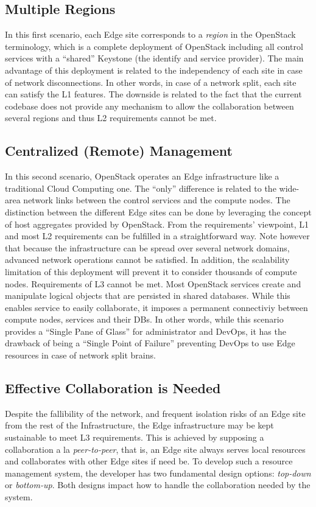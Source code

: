 \subsection{Multiple Regions}
In this first scenario, each Edge site corresponds to a \emph{region}
in the OpenStack terminology, which is a complete deployment of
OpenStack including all control services with a ``shared'' Keystone
(\ie the identify and service provider). The main advantage of this
deployment is related to the independency of each site in case of
network disconnections. In other words, in case of a network split,
each site can satisfy the L1 features. The downside is related to the
fact that the current codebase does not provide any mechanism to allow
the collaboration between several regions and thus L2 requirements
cannot be met.

\subsection{Centralized (Remote) Management}
\label{subsec:centralized_os}
In this second scenario, OpenStack operates an Edge infrastructure
like a traditional Cloud Computing one. The ``only'' difference is
related to the wide-area network links between the control services
and the compute nodes. The distinction between the different Edge
sites can be done by leveraging the concept of host aggregates
provided by OpenStack.
%
From the requirements' viewpoint, L1 and most L2 requirements can be
fulfilled in a straightforward way. Note however that because the
infrastructure can be spread over several network domains, advanced
network operations cannot be satisfied. In addition, the scalability
limitation of this deployment will prevent it to consider thousands of
compute nodes.
%
Requirements of L3 cannot be met. Most OpenStack services create and
manipulate logical objects that are persisted in shared databases.
While this enables service to easily collaborate, it imposes a
permanent connectiviy between compute nodes, services and their DBs.
In other words, while this scenario provides a ``Single Pane of
Glass'' for administrator and DevOps, it has the drawback of being a
``Single Point of Failure'' preventing DevOps to use Edge resources in
case of network split brains.

\subsection{Effective Collaboration is Needed}
Despite the fallibility of the network, and frequent isolation risks
of an Edge site from the rest of the Infrastructure, the Edge
infrastructure may be kept sustainable to meet L3 requirements. This
is achieved by supposing a collaboration a la \emph{peer-to-peer},
that is, an Edge site always serves local resources and collaborates
with other Edge sites if need be. To develop such a resource
management system, the developer has two fundamental design options:
\emph{top-down} or \emph{bottom-up}. Both designs impact how to handle
the collaboration needed by the system.

